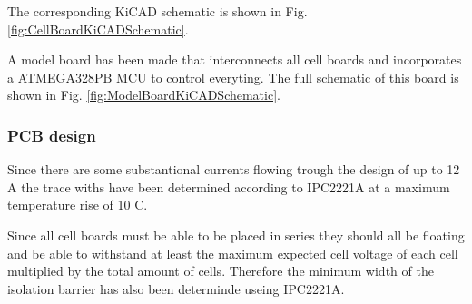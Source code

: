 The corresponding KiCAD schematic is shown in Fig. \ref{fig:CellBoardKiCADSchematic}.

A model board has been made that interconnects all cell boards and incorporates a ATMEGA328PB MCU to control everyting. The full schematic of this board is shown in Fig. \ref{fig:ModelBoardKiCADSchematic}.

\subsubsection{PCB design}
Since there are some substantional currents flowing trough the design of up to 12 A the trace withs have been determined according to IPC2221A at a maximum temperature rise of 10 \textdegree C.

Since all cell boards must be able to be placed in series they should all be floating and be able to withstand at least the maximum expected cell voltage of each cell multiplied by the total amount of cells. Therefore the minimum width of the isolation barrier has also been determinde useing IPC2221A.
